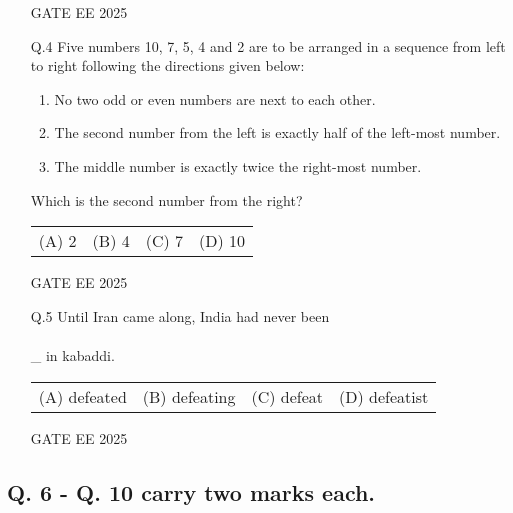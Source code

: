 \documentclass{article}
\begin{document}
\begin{enumerate}[leftmargin=*]
    GATE EE 2025
     \vspace{0.5cm} 
    \item[Q.4] Five numbers 10, 7, 5, 4 and 2 are to be arranged in a sequence from left to right following the directions given below:
    
    \begin{enumerate}[label=(\arabic*)]
        \item No two odd or even numbers are next to each other.
        \item The second number from the left is exactly half of the left-most number.
        \item The middle number is exactly twice the right-most number.
    \end{enumerate}
    
    Which is the second number from the right?
    
    \begin{tabular}{llll}
        (A) 2 & (B) 4 & (C) 7 & (D) 10
    \end{tabular}
    
    GATE EE 2025
     \vspace{0.5cm} 
    \item[Q.5] Until Iran came along, India had never been \\\\\_ in kabaddi.
    
    \begin{tabular}{llll}
        (A) defeated & (B) defeating & (C) defeat & (D) defeatist
    \end{tabular}
    
    GATE EE 2025
\end{enumerate}
 \vspace{0.5cm} 
\subsection*{Q. 6 - Q. 10 carry two marks each.}
\end{document}
